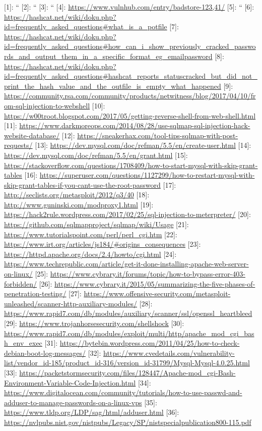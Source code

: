[1]:  ``
[2]: ``
[3]: ``
[4]: \url{https://www.vulnhub.com/entry/badstore-123,41/}
[5]: ``
[6]: \url{https://hashcat.net/wiki/doku.php?id=frequently_asked_questions\#what_is_a_potfile}
[7]: \url{https://hashcat.net/wiki/doku.php?id=frequently_asked_questions\#how_can_i_show_previously_cracked_passwords_and_output_them_in_a_specific_format_eg_emailpassword}
[8]: \url{https://hashcat.net/wiki/doku.php?id=frequently_asked_questions\#hashcat_reports_statuscracked_but_did_not_print_the_hash_value_and_the_outfile_is_empty_what_happened}
[9]: \url{https://community.rsa.com/community/products/netwitness/blog/2017/04/10/from-sql-injection-to-webshell}
[10]: \url{https://w00troot.blogspot.com/2017/05/getting-reverse-shell-from-web-shell.html}
[11]: \url{https://www.darkmoreops.com/2014/08/28/use-sqlmap-sql-injection-hack-website-database/}
[12]: \url{https://sneakerhax.com/tool-tips-sqlmap-with-post-requests/}
[13]: \url{https://dev.mysql.com/doc/refman/5.5/en/create-user.html}
[14]: \url{https://dev.mysql.com/doc/refman/5.5/en/grant.html}
[15]: \url{https://stackoverflow.com/questions/1708409/how-to-start-mysql-with-skip-grant-tables}
[16]: \url{https://superuser.com/questions/1127299/how-to-restart-mysql-with-skip-grant-tables-if-you-cant-use-the-root-password}
[17]: \url{http://seclists.org/metasploit/2012/q3/40}
[18]: \url{http://www.guninski.com/modproxy1.html}
[19]: \url{https://hack2rule.wordpress.com/2017/02/25/sql-injection-to-meterpreter/}
[20]: \url{https://github.com/sqlmapproject/sqlmap/wiki/Usage}
[21]: \url{https://www.tutorialspoint.com/perl/perl_cgi.htm}
[22]: \url{https://www.irt.org/articles/js184/\#origins_consequences}
[23]: \url{https://httpd.apache.org/docs/2.4/howto/cgi.html}
[24]: \url{https://www.techrepublic.com/article/get-it-done-installing-apache-web-server-on-linux/}
[25]: \url{https://www.cybrary.it/forums/topic/how-to-bypass-error-403-forbidden/}
[26]: \url{https://www.cybrary.it/2015/05/summarizing-the-five-phases-of-penetration-testing/}
[27]: \url{https://www.offensive-security.com/metasploit-unleashed/scanner-http-auxiliary-modules/}
[28]: \url{https://www.rapid7.com/db/modules/auxiliary/scanner/ssl/openssl_heartbleed}
[29]: \url{https://www.trojanhorsesecurity.com/shellshock}
[30]: \url{https://www.rapid7.com/db/modules/exploit/multi/http/apache_mod_cgi_bash_env_exec}
[31]: \url{https://bytebin.wordpress.com/2011/04/25/how-to-check-debian-boot-log-messages/}
[32]: \url{https://www.cvedetails.com/vulnerability-list/vendor_id-185/product_id-316/version_id-31799/Mysql-Mysql-4.0.25.html}
[33]: \url{https://packetstormsecurity.com/files/128447/Apache-mod_cgi-Bash-Environment-Variable-Code-Injection.html}
[34]: \url{https://www.digitalocean.com/community/tutorials/how-to-use-passwd-and-adduser-to-manage-passwords-on-a-linux-vps}
[35]: \url{https://www.tldp.org/LDP/sag/html/adduser.html}
[36]: \url{https://nvlpubs.nist.gov/nistpubs/Legacy/SP/nistspecialpublication800-115.pdf}



\markchapterendnotes

